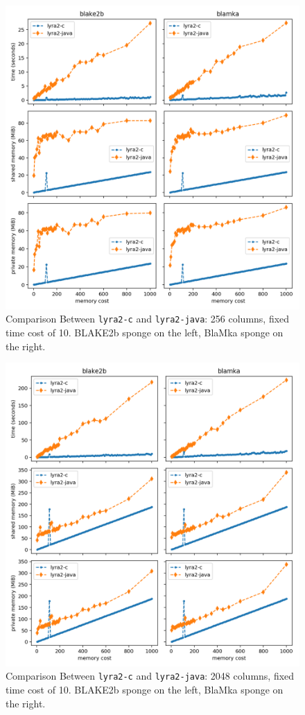 \begin{figure}[H]
    \centering
    \includegraphics[width=\linewidth,keepaspectratio]{figures/mcost_256}
    \caption{Comparison Between \texttt{lyra2-c} and \texttt{lyra2-java}: 256 columns, fixed time cost of 10. BLAKE2b sponge on the left, BlaMka sponge on the right.}
    \label{figure:mcost_256}
\end{figure}

\begin{figure}[H]
    \centering
    \includegraphics[width=\linewidth,keepaspectratio]{figures/mcost_2048}
    \caption{Comparison Between \texttt{lyra2-c} and \texttt{lyra2-java}: 2048 columns, fixed time cost of 10. BLAKE2b sponge on the left, BlaMka sponge on the right.}
    \label{figure:mcost_2048}
\end{figure}

